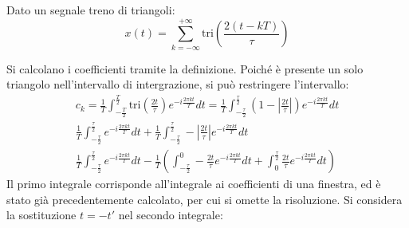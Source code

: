 \documentclass{article}
\begin{document}
Dato un segnale treno di triangoli:
\begin{equation*}
    x(t)=\displaystyle\sum_{k=-\infty}^{+\infty}\mbox{tri}\left(\frac{2(t-kT)}{\tau}\right)
\end{equation*}
\begin{center}
\end{center}
Si calcolano i coefficienti tramite la definizione. Poiché è presente un solo triangolo nell'intervallo di intergrazione, si può restringere l'intervallo: 
\begin{gather*}
    c_k=\displaystyle\frac{1}{T}\int_{-\frac{T}{2}}^{\frac{T}{2}}\mbox{tri}\left(\frac{2t}{\tau}\right)e^{-i\frac{2\pi kt}{T}}dt=\frac{1}{T}\int_{-\frac{\tau}{2}}^{\frac{\tau}{2}}\left(1-\left|\frac{2t}{\tau}\right|\right)e^{-i\frac{2\pi kt}{T}}dt\\
    \displaystyle\frac{1}{T}\int_{-\frac{\tau}{2}}^{\frac{\tau}{2}}e^{-i\frac{2\pi kt}{T}}dt+\frac{1}{T}\int_{-\frac{\tau}{2}}^{\frac{\tau}{2}}-\left|\frac{2t}{\tau}\right|e^{-i\frac{2\pi kt}{T}}dt\\
    \displaystyle\frac{1}{T}\int_{-\frac{\tau}{2}}^{\frac{\tau}{2}}e^{-i\frac{2\pi kt}{T}}dt-\frac{1}{T}\left(\int_{-\frac{\tau}{2}}^{0}-\frac{2t}{\tau}e^{-i\frac{2\pi kt}{T}}dt+\int_{0}^{\frac{\tau}{2}}\frac{2t}{\tau}e^{-i\frac{2\pi kt}{T}}dt\right)
\end{gather*}
Il primo integrale corrisponde all'integrale ai coefficienti di una finestra, ed è stato già precedentemente calcolato, per cui si omette la risoluzione. Si considera la 
sostituzione $t=-t'$ nel secondo integrale:
\end{document}
